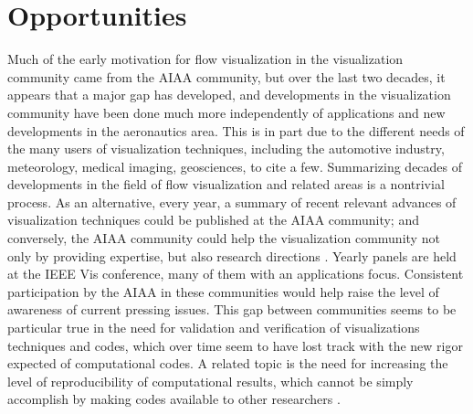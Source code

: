 \section{Opportunities}
\label{sec:opportunities}

Much of the early motivation for flow visualization in the
visualization community came from the AIAA community, but over the last
two decades, it appears that a major gap has developed, and
developments in the visualization community have been done much more
independently of applications and new developments in the aeronautics
area. This is in part due to the different needs of the many users of 
visualization techniques, including the automotive industry, meteorology, 
medical imaging, geosciences, to cite a few. 
Summarizing decades of developments in the field of flow visualization and
related areas is a nontrivial process. As an alternative,
every year, a summary of recent relevant advances of visualization techniques could be 
published at the AIAA community; and conversely, the AIAA 
community could help the visualization community not only by providing
expertise, but also research directions \cite{Munzner:2006:NVR:1128586.1128614}.
Yearly panels are held at the IEEE Vis conference, many of them with an applications
focus.  Consistent participation by the AIAA in these communities would help
raise the level of awareness of current pressing issues.
%
This gap between communities seems 
to be particular true in the need for validation and
verification of visualizations techniques and codes, which over time
seem to have lost track with the new rigor expected of computational
codes. A related topic is the need for increasing the level of
reproducibility of computational results, which cannot be simply
accomplish by making codes available to other researchers
 \cite{Silva:2007:PVR:1300781.1302461}.

